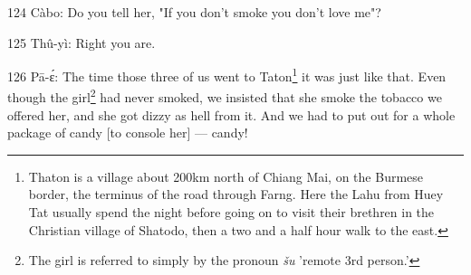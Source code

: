 124 Càbo: Do you tell her, "If you don't smoke you don't love me"?

125 Thû-yì: Right you are.

126 Pā-ɛ́: The time those three of us went to Taton\footnote{Thaton is a village about 200km north of Chiang Mai, on the Burmese border, the terminus of the road through Farng. Here the  Lahu from Huey Tat usually spend the night before going on to visit their brethren in the Christian village of Shatodo, then a two and a half hour walk to the east.} it was just like that.
Even though the girl\footnote{The girl is referred to simply by the pronoun \textit{šu} 'remote 3rd person.'} had never smoked, we insisted that she smoke the tobacco
we offered her, and she got dizzy as hell from it. And we had to put out for a
whole package of candy [to console her] --- candy!


